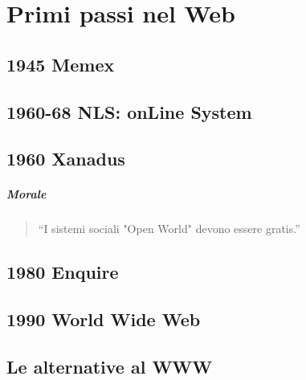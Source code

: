 

\section{Primi passi nel Web}
	
	\subsection{1945 Memex}
		
	\subsection{1960-68 NLS: onLine System}
		
	\subsection{1960 Xanadus}
		
	\subparagraph*{Morale}
			\begin{quote}
				``I sistemi sociali "Open World" devono essere gratis.''
			\end{quote}
		
	\subsection{1980 Enquire}
		
	\subsection{1990 World Wide Web}
		
	\subsection{Le alternative al WWW}
